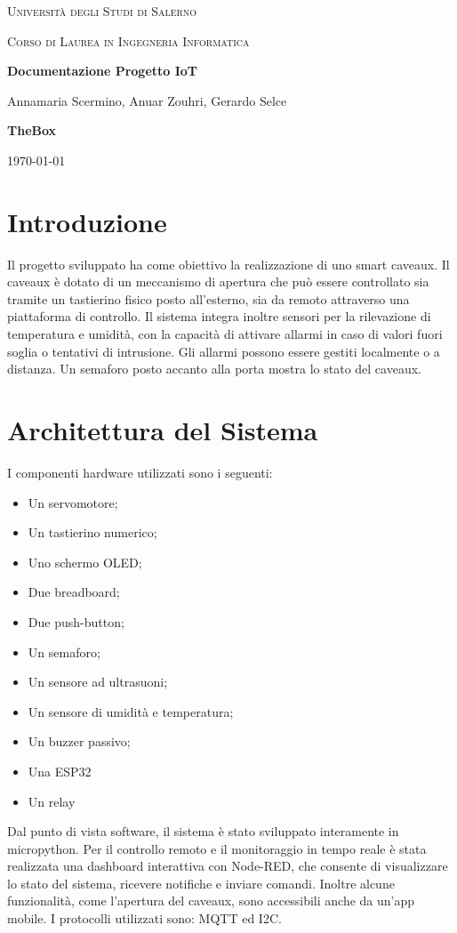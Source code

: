 \documentclass[12pt,a4paper]{article}
\begin{document}
	
	\begin{titlepage}
		\centering
		{\scshape\LARGE Università degli Studi di Salerno \par}
		\vspace{1cm}
		{\scshape\Large Corso di Laurea in Ingegneria Informatica\par}
		\vspace{2cm}
		{\huge\bfseries Documentazione Progetto IoT\par}
		\vspace{1.5cm}
		{\Large Annamaria Scermino, Anuar Zouhri, Gerardo Selce \par}
		\vspace{1.5cm}
		{\huge\bfseries TheBox\par}
		\vfill
		{\large \today\par}
	\end{titlepage}
	
	\tableofcontents
	\newpage
	
	\section{Introduzione}
	Il progetto sviluppato ha come obiettivo la realizzazione di uno smart caveaux. Il caveaux è dotato di un meccanismo di apertura che può essere controllato sia tramite un tastierino fisico posto all’esterno, sia da remoto attraverso una piattaforma di controllo. Il sistema integra inoltre sensori per la rilevazione di temperatura e umidità, con la capacità di attivare allarmi in caso di valori fuori soglia o tentativi di intrusione. Gli allarmi possono essere gestiti localmente o a distanza. Un semaforo posto accanto alla porta mostra lo stato del caveaux.
	
	\section{Architettura del Sistema}
	I componenti hardware utilizzati sono i seguenti:
	\begin{itemize}
		\item Un servomotore;
		\item Un tastierino numerico;
		\item Uno schermo OLED;
		\item Due breadboard;
		\item Due push-button;
		\item Un semaforo;
		\item Un sensore ad ultrasuoni;
		\item Un sensore di umidità e temperatura;
		\item Un buzzer passivo;
		\item Una ESP32
		\item Un relay 
	\end{itemize}
	Dal punto di vista software, il sistema è stato sviluppato interamente in micropython. Per il controllo remoto e il monitoraggio in tempo reale è stata realizzata una dashboard interattiva con Node-RED, che consente di visualizzare lo stato del sistema, ricevere notifiche e inviare comandi. Inoltre alcune funzionalità, come l'apertura del caveaux, sono accessibili anche da un'app mobile. I protocolli utilizzati sono: MQTT ed I2C.
	
\end{document}
